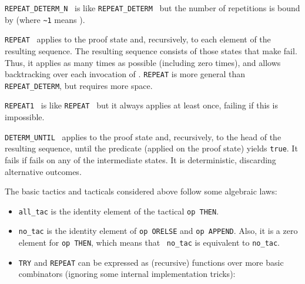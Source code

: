 \begin{isabellebody}
\begin{isamarkuptext}
\begin{description}
  \item \verb|REPEAT_DETERM_N|~ is like \verb|REPEAT_DETERM|~ but the number of repetitions is bound
  by  (where \verb|~1| means ).

  \item \verb|REPEAT|~ applies  to the proof
  state and, recursively, to each element of the resulting sequence.
  The resulting sequence consists of those states that make  fail.  Thus, it applies  as many times as
  possible (including zero times), and allows backtracking over each
  invocation of .  \verb|REPEAT| is more general than \verb|REPEAT_DETERM|, but requires more space.

  \item \verb|REPEAT1|~ is like \verb|REPEAT|~
  but it always applies  at least once, failing if this
  is impossible.

  \item \verb|DETERM_UNTIL|~ applies  to
  the proof state and, recursively, to the head of the resulting
  sequence, until the predicate  (applied on the proof
  state) yields \verb|true|. It fails if  fails on any of
  the intermediate states. It is deterministic, discarding alternative
  outcomes.

  \end{description}%
\end{isamarkuptext}%
\isamarkuptrue%
%
\endisatagmlref
{\isafoldmlref}%
%
\isadelimmlref
%
\endisadelimmlref
%
\isadelimmlex
%
\endisadelimmlex
%
\isatagmlex
%
\begin{isamarkuptext}%
The basic tactics and tacticals considered above follow
  some algebraic laws:

  \begin{itemize}

  \item \verb|all_tac| is the identity element of the tactical
  \verb|op THEN|.

  \item \verb|no_tac| is the identity element of \verb|op ORELSE| and
  \verb|op APPEND|.  Also, it is a zero element for \verb|op THEN|,
  which means that ~\verb|no_tac| is equivalent to
  \verb|no_tac|.

  \item \verb|TRY| and \verb|REPEAT| can be expressed as (recursive)
  functions over more basic combinators (ignoring some internal
  implementation tricks):


\end{itemize}
\end{isamarkuptext}
\end{isabellebody}
